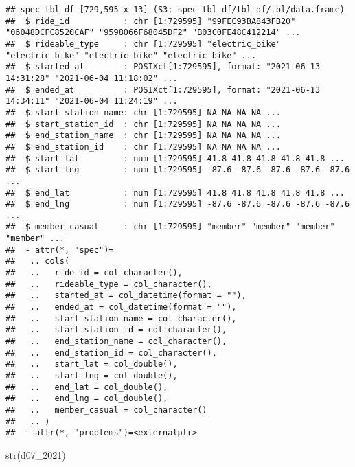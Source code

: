 \documentclass[
]{article}
\newenvironment{Shaded}{\begin{snugshade}}{\end{snugshade}}
\newcommand{\FunctionTok}[1]{\textcolor[rgb]{0.00,0.00,0.00}{#1}}
\newcommand{\NormalTok}[1]{#1}
\begin{document}
\begin{verbatim}
## spec_tbl_df [729,595 x 13] (S3: spec_tbl_df/tbl_df/tbl/data.frame)
##  $ ride_id           : chr [1:729595] "99FEC93BA843FB20" "06048DCFC8520CAF" "9598066F68045DF2" "B03C0FE48C412214" ...
##  $ rideable_type     : chr [1:729595] "electric_bike" "electric_bike" "electric_bike" "electric_bike" ...
##  $ started_at        : POSIXct[1:729595], format: "2021-06-13 14:31:28" "2021-06-04 11:18:02" ...
##  $ ended_at          : POSIXct[1:729595], format: "2021-06-13 14:34:11" "2021-06-04 11:24:19" ...
##  $ start_station_name: chr [1:729595] NA NA NA NA ...
##  $ start_station_id  : chr [1:729595] NA NA NA NA ...
##  $ end_station_name  : chr [1:729595] NA NA NA NA ...
##  $ end_station_id    : chr [1:729595] NA NA NA NA ...
##  $ start_lat         : num [1:729595] 41.8 41.8 41.8 41.8 41.8 ...
##  $ start_lng         : num [1:729595] -87.6 -87.6 -87.6 -87.6 -87.6 ...
##  $ end_lat           : num [1:729595] 41.8 41.8 41.8 41.8 41.8 ...
##  $ end_lng           : num [1:729595] -87.6 -87.6 -87.6 -87.6 -87.6 ...
##  $ member_casual     : chr [1:729595] "member" "member" "member" "member" ...
##  - attr(*, "spec")=
##   .. cols(
##   ..   ride_id = col_character(),
##   ..   rideable_type = col_character(),
##   ..   started_at = col_datetime(format = ""),
##   ..   ended_at = col_datetime(format = ""),
##   ..   start_station_name = col_character(),
##   ..   start_station_id = col_character(),
##   ..   end_station_name = col_character(),
##   ..   end_station_id = col_character(),
##   ..   start_lat = col_double(),
##   ..   start_lng = col_double(),
##   ..   end_lat = col_double(),
##   ..   end_lng = col_double(),
##   ..   member_casual = col_character()
##   .. )
##  - attr(*, "problems")=<externalptr>
\end{verbatim}

\begin{Shaded}
\begin{Highlighting}[]
\FunctionTok{str}\NormalTok{(d07\_2021)}
\end{Highlighting}
\end{Shaded}
\end{document}
